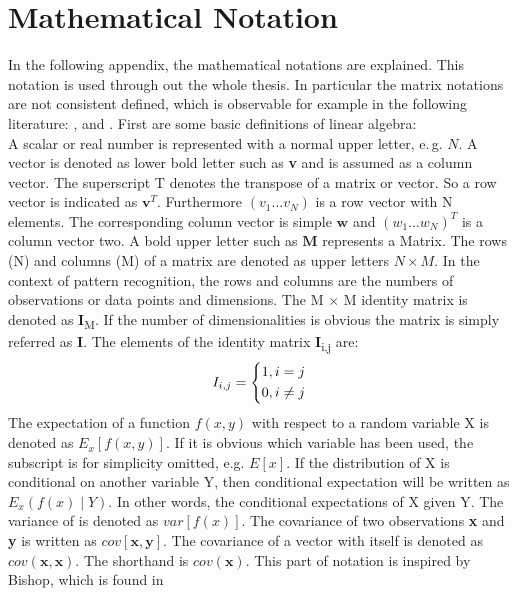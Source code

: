 \chapter{Mathematical Notation}\label{appaA}
In the following appendix, the mathematical notations are explained.
This notation is used through out the whole thesis.
In particular the matrix notations are not consistent defined, which is observable for example in the following literature: \cite{Chen.2009}, \cite{Bishop.2009} and \cite{Long.2015}.
First are some basic definitions of linear algebra:\\
A scalar or real number is represented with a normal upper letter, e.\,g. $N$.
A vector is denoted as lower bold letter such as \textbf{v} and is assumed as a column vector.
The superscript T denotes the transpose of a matrix or vector. So a row vector is indicated as $\mathbf{v}^{T}$.
Furthermore $(v_1 \dots v_N)$ is a row vector with N elements.
The corresponding column vector is simple $\mathbf{w}$ and $(w_1 \dots w_N)^T$ is a column vector two.
A bold upper letter such as $\mathbf{M}$ represents a Matrix.
The rows (N) and columns (M) of a matrix are denoted as upper letters $N \times M$. 
In the context of pattern recognition, the rows and columns are the numbers of observations or data points and dimensions. 
The M $\times$ M identity matrix is denoted as \textbf{I}\textsubscript{M}.
If the number of dimensionalities is obvious the matrix is simply referred as \textbf{I}.
The elements of the identity matrix \textbf{I}\textsubscript{i,j} are:
\[
I_{i,j}= \begin{dcases*}
1, i = j\\
0, i \neq j
\end{dcases*}
\]
The expectation of a function $f(x,y)$ with respect to a random variable X is denoted as $E_x[f(x,y)]$.
If it is obvious which variable has been used, the subscript is for simplicity omitted, e.g. $E[x]$.
If the distribution of X is conditional on another variable Y, then conditional expectation will be written as $E_x(f(x)\mid Y)$. In other words, the conditional expectations of X given Y.\newline
The variance of is denoted as $var[f(x)]$.
The covariance of two observations \textbf{x} and \textbf{y} is written as $cov[\textbf{x},\textbf{y}]$.
The covariance of a vector with itself is denoted as $cov(\textbf{x},\textbf{x})$. The shorthand is $cov(\textbf{x})$.\newline
This part of notation is inspired by Bishop, which is found in \cite[p. xi - xii]{Bishop.2009}\\
